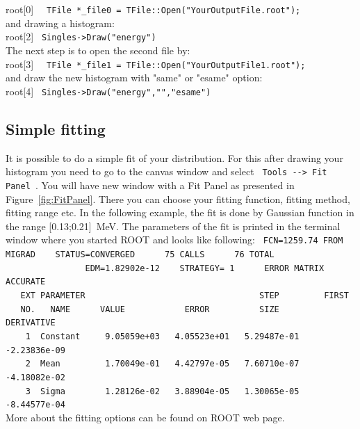 \documentclass[12pt]{article}
\begin{document}
root[0] \verb|  TFile *_file0 = TFile::Open("YourOutputFile.root");|\\

and drawing a histogram:\\

root[2] \verb| Singles->Draw("energy") | \\

The next step is to open the second file by: \\

root[3] \verb|  TFile *_file1 = TFile::Open("YourOutputFile1.root");|\\

and draw the new histogram with "same" or "esame" option:\\

root[4] \verb| Singles->Draw("energy","","esame") |\\


\subsection{Simple fitting}
It is possible to do a simple fit of your distribution. For this after drawing your histogram you need to go to the canvas window and select \verb| Tools --> Fit Panel |. You will have new window with a Fit Panel as presented in Figure~\ref{fig:FitPanel}. There you can choose your fitting function, fitting method, fitting range etc. In the following example, the fit is done by Gaussian function in the range [0.13;0.21]~MeV. The parameters of the fit is printed in the terminal window where you started ROOT and looks like following:
\verb| FCN=1259.74 FROM MIGRAD    STATUS=CONVERGED      75 CALLS      76 TOTAL|\\
\verb|                EDM=1.82902e-12    STRATEGY= 1      ERROR MATRIX ACCURATE| \\
\verb|   EXT PARAMETER                                   STEP         FIRST|   \\
\verb|   NO.   NAME      VALUE            ERROR          SIZE      DERIVATIVE |\\
\verb|    1  Constant     9.05059e+03   4.05523e+01   5.29487e-01  -2.23836e-09 |\\
\verb|    2  Mean         1.70049e-01   4.42797e-05   7.60710e-07  -4.18082e-02|\\
\verb|    3  Sigma        1.28126e-02   3.88904e-05   1.30065e-05  -8.44577e-04|\\

More about the fitting options can be found on ROOT web page.
\end{document}
